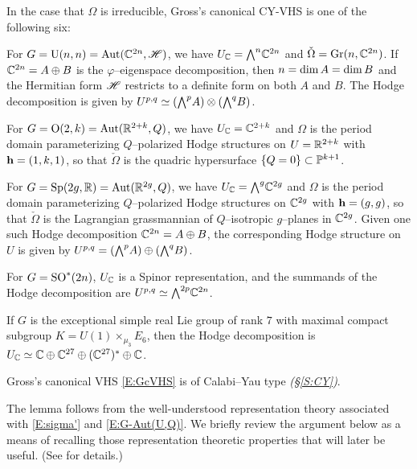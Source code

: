 \documentclass[12pt]{amsart}
\numberwithin{equation}{section}
\numberwithin{table}{section}
\numberwithin{figure}{section}
\begin{document}
\begin{example}
In the case that $\Omega$ is irreducible, Gross's canonical CY-VHS is one of the following six:
\begin{a_list}
\item
For $G = \mathrm{U}(n, n) = \mathrm{Aut}(\mathbb C^{2n},\mathscr{H})$, we have $U_\mathbb C = \hbox{\small $\bigwedge$}^n\mathbb C^{2n}$ and $\check \Omega = \mathrm{Gr}(n,\mathbb C^{2n})$.  If $\mathbb C^{2n} = A \oplus B$ is the $\varphi$--eigenspace decomposition, then $n = \mathrm{dim}\,A = \mathrm{dim}\,B$ and the Hermitian form $\mathscr{H}$ restricts to a definite form on both $A$ and $B$.  The Hodge decomposition is given by $U^{p,q} \simeq (\hbox{\small $\bigwedge$}^pA) \otimes (\hbox{\small $\bigwedge$}^q B)$.
\item
For $G = \mathrm{O}(2,k) = \mathrm{Aut}(\mathbb R^{2+k},Q)$, we have $U_\mathbb C = \mathbb C^{2+k}$ and $\Omega$ is the period domain parameterizing $Q$--polarized Hodge structures on $U = \mathbb R^{2+k}$ with $\mathbf{h} = (1,k,1)$, so that $\check\Omega$ is the quadric hypersurface $\{Q=0\} \subset \mathbb P^{k+1}$.
\item 
For $G = \mathrm{Sp}(2g,\mathbb R) = \mathrm{Aut}(\mathbb R^{2g},Q)$, we have $U_\mathbb C = \hbox{\small $\bigwedge$}^g\mathbb C^{2g}$ and $\Omega$ is the period domain parameterizing $Q$--polarized Hodge structures on $\mathbb C^{2g}$ with $\mathbf{h} = (g,g)$, so that $\check \Omega$ is the Lagrangian grassmannian of $Q$--isotropic $g$--planes in $\mathbb C^{2g}$.  Given one such Hodge decomposition $\mathbb C^{2n} = A \oplus B$, the corresponding Hodge structure on $U$ is given by $U^{p,q} = (\hbox{\small $\bigwedge$}^pA) \oplus (\hbox{\small $\bigwedge$}^q B)$.
\item 
For $G = \mathrm{SO}^*(2n)$, $U_\mathbb C$ is a Spinor representation, and the summands of the Hodge decomposition are $U^{p,q} \simeq \hbox{\small $\bigwedge$}^{2p}\mathbb C^{2n}$.
\item 
If $G$ is the exceptional simple real Lie group of rank $7$ with maximal compact subgroup $K = U(1) \times_{\mu_3} E_6$, then the Hodge decomposition is $U_\mathbb C \simeq \mathbb C \oplus \mathbb C^{27} \oplus (\mathbb C^{27})^* \oplus \mathbb C$.
\end{a_list}
\end{example}

\begin{lemma} \label{L:gross}
Gross's canonical VHS \eqref{E:GcVHS} is of Calabi--Yau type \emph{(\S\ref{S:CY})}.
\end{lemma}

\noindent The lemma follows from the well-understood representation theory associated with \eqref{E:sigma'} and \eqref{E:G-Aut(U,Q)}.  We briefly review the argument below as a means of recalling those representation theoretic properties that will later be useful.  (See \cite{MR1258484} for details.)  
\end{document}

